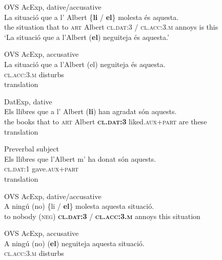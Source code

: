 \documentclass[output=paper,colorlinks,citecolor=brown,nonflat]{./langscibook}
\begin{document}
\ea%
 \label{ex:royo:10}
 \ea  OVS AcExp, {dative/accusative} \label{ex:royo:10a}\\
 \gll  La situació que a l’ Albert \{\textbf{li} / \textbf{el}\} molesta és aquesta.\\
	 the situation that to \textsc{art} Albert \textsc{cl.dat:3} / \textsc{cl.acc:3.m} annoys is this \\
 \glt `La situació que a l’Albert (\textbf{el}) neguiteja és aquesta.'
 
 \ex OVS AcExp, {accusative}\label{ex:royo:10b}\\
 \gll La  situació  que a  l’Albert (el) neguiteja és aquesta.\\
   \textsc{cl.acc}:3.\textsc{m} disturbs \\
 \glt  translation
  
 \ex  DatExp, {dative} \label{ex:royo:10c}\\
 \gll Els llibres que a l’ Albert (\textbf{li}) han agradat són aquests.\\
  the books that to \textsc{art} Albert \textbf{\textsc{cl.dat:3}} liked.\textsc{aux+part} are these\\
 \glt  translation
 
  
 
  
 \ex  Preverbal subject\label{ex:royo:10e}\\
 \gll  Els llibres que l’Albert m’ ha donat són aquests.\\
	 	 \textsc{cl.dat:1} gave.\textsc{aux+part} \\
 \glt  translation
 
 \z
 \z
 

\ea%
 \label{ex:royo:11}
 \ea OVS AcExp, {dative/accusative}\label{ex:royo:11a}\\
 \gll  A ningú (no) \{{li} / \textbf{el}\} molesta aquesta situació.\\
    to nobody (\textsc{neg}) \textbf{\textsc{cl.dat:3}} / \textbf{\textsc{cl.acc:3.m}} annoys this situation \\
\glt {}
 
 
 \ex OVS AcExp, {accusative} \label{ex:royo:11b}\\
 \gll A ningú (no) (\textbf{el}) neguiteja aquesta situació.\\
  	 \textsc{cl.acc:3.m} disturbs\\ 
\glt {}
 
\end{document}
